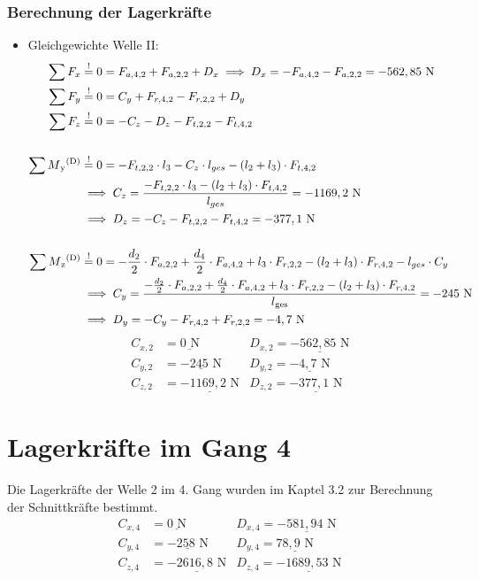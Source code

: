 \subsubsection{Berechnung der Lagerkräfte}
\begin{itemize}
	\item Gleichgewichte Welle II:
	\begin{align*}
	\sum F_x &\overset{!}{=} 0 = F_{a,4,2} +F_{a,2,2} + D_x \implies D_x = -F_{a,4,2} -F_{a,2,2}= -562,85 \text{ N} \\
	\sum F_y &\overset{!}{=} 0 = C_y +F_{r,4,2}- F_{r,2,2}+D_y \\ 
	\sum F_z &\overset{!}{=} 0 = - C_z - D_z - F_{t,2,2} - F_{t,4,2} \\ \\
	\sum M\textsubscript{y}\textsuperscript{(D)} &\overset{!}{=} 0 = - F_{t,2,2} \cdot l_3 - C_z \cdot l_{ges} -(l_2 + l_3) \cdot F_{t,4,2} \\ 
	&\implies C_z = \frac{- F_{t,2,2} \cdot l_3 - (l_2+l_3) \cdot F_{t,4,2} }{l_{ges}} = -1169,2 \text { N} \\ 
	& \implies D_z = - C_z - F_{t,2,2} - F_{t,4,2}= -377,1 \text{ N}\\ \\
	\sum M\textsubscript{z}\textsuperscript{(D)} &\overset{!}{=} 0 = - \frac{d_2}{2} \cdot F_{a,2,2} + \frac{d_4}{2} \cdot F_{a,4,2} + l_3 \cdot F_{r,2,2} - (l_2 + l_3) \cdot F_{r,4,2}- l_{ges} \cdot C_y  \\ 
	&\implies C_y = \frac{- \frac{d_2}{2} \cdot F_{a,2,2} + \frac{d_4}{2} \cdot F_{a,4,2}  + l_3 \cdot F_{r,2,2} - (l_2 + l_3) \cdot F_{r,4,2}}{l\textsubscript{ges}} = -245 \text{ N}\\ 
	& \implies D_y =  - C_y - F_{r,4,2} + F_{r,2,2} = -4,7\text{ N}
	\end{align*}
	\begin{align*}
	C_{x,2} &= \underline{0\text{ N}} & D_{x,2}= \underline{-562,85\text{ N}}\\
	C_{y,2} &= \underline{-245\text{ N}} & D_{y,2}= \underline{-4,7\text{ N}}\\
	C_{z,2} &= \underline{-1169,2\text{ N}} & D_{z,2}= \underline{-377,1\text{ N}}
	\end{align*}
\end{itemize}
\section{Lagerkräfte im Gang 4}
Die Lagerkräfte der Welle 2 im 4. Gang wurden im Kaptel 3.2 zur Berechnung der Schnittkräfte bestimmt.
\begin{align*}
	C_{x,4} &= \underline{0\text{ N}} & D_{x,4}= \underline{-581,94\text{ N}}\\
	C_{y,4} &= \underline{-258\text{ N}} & D_{y,4}= \underline{78,9\text{ N}}\\
	C_{z,4} &= \underline{-2616,8\text{ N}} & D_{z,4}= \underline{-1689,53\text{ N}}
\end{align*}
